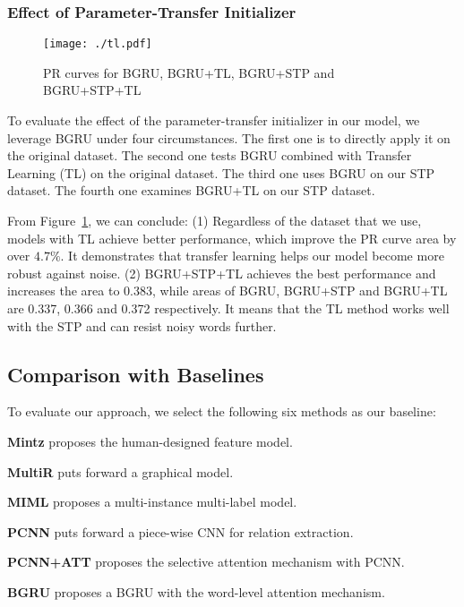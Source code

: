 \documentclass[11pt,a4paper]{article}
\begin{document}
  \subsubsection*{Effect of Parameter-Transfer Initializer}

  \begin{figure}[htbp]
    \centering
    \texttt{[image: ./tl.pdf]}
    \caption{PR curves for BGRU, BGRU+TL, BGRU+STP and BGRU+STP+TL}
    \label{fig:tl}
  \end{figure}

  To evaluate the effect of the parameter-transfer initializer in our model, we leverage BGRU under four circumstances. The first one is to directly apply it on the original dataset. The second one tests BGRU combined with Transfer Learning (TL) on the original dataset. The third one uses BGRU on our STP dataset. The fourth one examines BGRU+TL on our STP dataset.

  From Figure~\ref{fig:tl}, we can conclude: (1) Regardless of the dataset that we use, models with TL achieve better performance, which improve the PR curve area by over $4.7\%$. It demonstrates that transfer learning helps our model become more robust against noise. (2) BGRU+STP+TL achieves the best performance and increases the area to $0.383$, while areas of BGRU, BGRU+STP and BGRU+TL are 0.337, 0.366 and 0.372 respectively. It means that the TL method works well with the STP and can resist noisy words further. 
  
  \subsection{Comparison with Baselines}
  To evaluate our approach, we select the following six methods as our baseline:
  
  \textbf{Mintz} \citep{mintz2009distant} proposes the human-designed feature model.
  
  \textbf{MultiR} \citep{hoffmann2011knowledge} puts forward a graphical model.

  \textbf{MIML} \citep{surdeanu2012multi} proposes a multi-instance multi-label model.

  \textbf{PCNN} \citep{zeng2015distant} puts forward a piece-wise CNN for relation extraction.

  \textbf{PCNN+ATT} \citep{lin2016neural} proposes the selective attention mechanism with PCNN.

  \textbf{BGRU} \citep{zhou2016attention} proposes a BGRU with the word-level attention mechanism.
\end{document}

